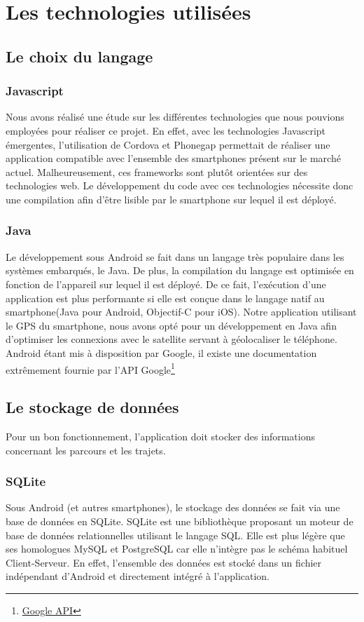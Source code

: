 \chapter{Les technologies utilisées}
\section{Le choix du langage}

\subsection{Javascript}
Nous avons réalisé une étude sur les différentes technologies que nous pouvions employées pour réaliser ce projet. En effet, avec les technologies Javascript émergentes, l'utilisation de Cordova et Phonegap permettait de réaliser une application compatible avec l'ensemble des smartphones présent sur le marché actuel. Malheureusement, ces frameworks sont plutôt orientées sur des technologies web. Le développement du code avec ces technologies nécessite donc une compilation afin d'être lisible par le smartphone sur lequel il est déployé. 

\subsection{Java}
Le développement sous Android se fait dans un langage très populaire dans les systèmes embarqués, le Java. De plus, la compilation du langage est optimisée en fonction de l’appareil sur lequel il est déployé. De ce fait, l’exécution d'une application est plus performante si elle est conçue dans le langage natif au smartphone(Java pour Android, Objectif-C pour iOS). Notre application utilisant le GPS du smartphone, nous avons opté pour un développement en Java afin d'optimiser les connexions avec le satellite servant à géolocaliser le téléphone. Android étant mis à disposition par Google, il existe une documentation extrêmement fournie par l'API Google\footnote{\href{http://developer.android.com/index.html}{Google API}}

\section{Le stockage de données}
Pour un bon fonctionnement, l'application doit stocker des informations concernant les parcours et les trajets. 

\subsection{SQLite}
Sous Android (et autres smartphones), le stockage des données se fait via une base de données en SQLite. SQLite est une bibliothèque proposant un moteur de base de données relationnelles utilisant le langage SQL. Elle est plus légère que ses homologues MySQL et PostgreSQL car elle n'intègre pas le schéma habituel Client-Serveur. En effet, l'ensemble des données est stocké dans un fichier indépendant d'Android et directement intégré à l'application.

